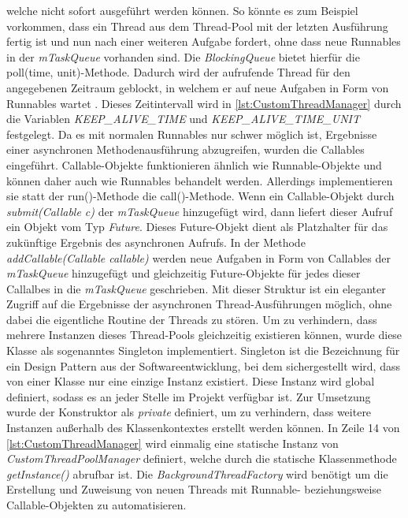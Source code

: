 welche nicht sofort ausgeführt werden können. So könnte es zum Beispiel vorkommen, dass ein Thread aus dem Thread-Pool mit der letzten Ausführung fertig ist und nun nach einer weiteren Aufgabe fordert, ohne dass neue Runnables in der \emph{ mTaskQueue} vorhanden sind. Die \emph{ BlockingQueue} bietet hierfür die  poll(time, unit)-Methode. Dadurch wird der aufrufende Thread für den angegebenen Zeitraum geblockt, in welchem er auf neue Aufgaben in Form von Runnables wartet \cite{BlockingQueue}. Dieses Zeitintervall wird in \autoref{lst:CustomThreadManager} durch die Variablen \emph{ KEEP\_ALIVE\_TIME} und \emph{ KEEP\_ALIVE\_TIME\_UNIT} festgelegt. Da es mit normalen Runnables nur schwer möglich ist, Ergebnisse einer asynchronen Methodenausführung abzugreifen, wurden die Callables eingeführt. Callable-Objekte funktionieren ähnlich wie Runnable-Objekte und können daher auch wie Runnables behandelt werden. Allerdings implementieren sie statt der run()-Methode die call()-Methode. Wenn ein Callable-Objekt durch \emph{submit(Callable c)} der \emph{ mTaskQueue} hinzugefügt wird, dann  liefert  dieser Aufruf ein Objekt vom Typ \emph{Future}. Dieses Future-Objekt dient als Platzhalter für das zukünftige Ergebnis des asynchronen Aufrufs.  In der Methode \emph{ addCallable(Callable callable)} werden neue Aufgaben in Form von Callables der \emph{ mTaskQueue} hinzugefügt und gleichzeitig Future-Objekte für jedes dieser Callalbes in die \emph{ mTaskQueue} geschrieben. Mit dieser Struktur ist ein eleganter Zugriff auf die Ergebnisse der asynchronen Thread-Ausführungen möglich, ohne dabei die eigentliche Routine der Threads zu stören. Um zu verhindern, dass mehrere Instanzen dieses Thread-Pools gleichzeitig existieren können, wurde diese Klasse als sogenanntes Singleton implementiert. Singleton ist die Bezeichnung für ein Design Pattern aus der Softwareentwicklung, bei dem sichergestellt wird, dass von einer Klasse nur eine einzige Instanz existiert. Diese Instanz wird global definiert, sodass es an jeder Stelle im Projekt verfügbar ist.  Zur Umsetzung wurde der Konstruktor als \emph{private} definiert, um zu verhindern, dass weitere Instanzen außerhalb des Klassenkontextes erstellt werden können. In Zeile 14 von \autoref{lst:CustomThreadManager} wird einmalig eine statische Instanz von \emph{CustomThreadPoolManager} definiert, welche durch die statische Klassenmethode \emph{getInstance()} abrufbar ist. Die \emph{BackgroundThreadFactory} wird benötigt um die Erstellung und Zuweisung von neuen Threads mit Runnable-  beziehungsweise Callable-Objekten zu automatisieren.

